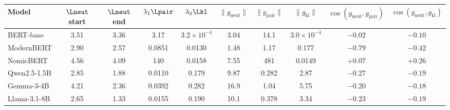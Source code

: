   \footnotesize\setlength{\tabcolsep}{4pt}
  \begin{tabular}{@{}lccccccccc@{}}
    \toprule
    Model & $\Lneut$ start & $\Lneut$ end & $\lambda_1\Lpair$ & $\lambda_2\Lkl$ & $\|g_{\mathrm{neut}}\|$ & $\|g_{\mathrm{pair}}\|$ & $\|g_{\mathrm{kl}}\|$ & $\cos(g_{\mathrm{neut}},g_{\mathrm{pair}})$ & $\cos(g_{\mathrm{neut}},g_{\mathrm{kl}})$ \\
    \midrule
    BERT-base & 3.51 & 3.36 & 3.17 & $3.2{\times}10^{-4}$ & 3.04 & 14.1 & $3.0{\times}10^{-4}$ & $-0.02$ & $-0.10$ \\
    ModernBERT & 2.90 & 2.57 & 0.0851 & 0.0130 & 1.48 & 1.17 & 0.177 & $-0.79$ & $-0.42$ \\
    NomicBERT & 4.56 & 4.09 & 140 & 0.0158 & 7.55 & 481 & 0.0149 & $+0.07$ & $+0.26$ \\
    Qwen2.5-1.5B & 2.85 & 1.88 & 0.0110 & 0.179 & 9.87 & 0.282 & 2.87 & $-0.27$ & $-0.19$ \\
    Gemma-3-4B & 4.21 & 2.36 & 0.0392 & 0.282 & 16.9 & 1.04 & 5.75 & $-0.20$ & $-0.18$ \\
    Llama-3.1-8B & 2.65 & 1.33 & 0.0155 & 0.190 & 10.1 & 0.378 & 3.34 & $-0.23$ & $-0.19$ \\
    \bottomrule
  \end{tabular}
